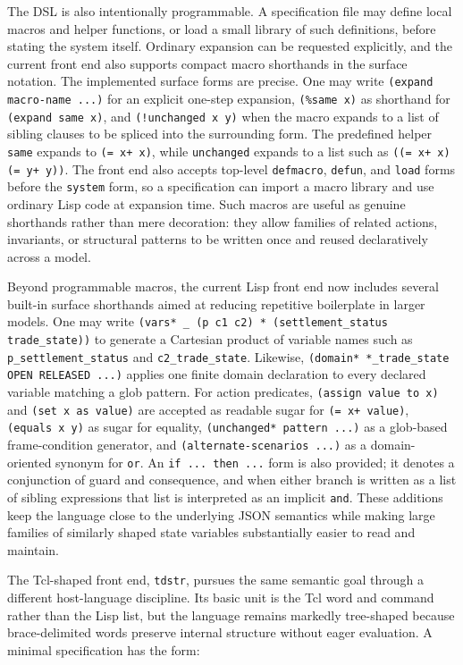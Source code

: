\documentclass[11pt]{article}
\begin{document}
The DSL is also intentionally programmable. A specification file may define
local macros and helper functions, or load a small library of such definitions,
before stating the system itself. Ordinary expansion can be requested
explicitly, and the current front end also supports compact macro shorthands in
the surface notation. The implemented surface forms are precise. One may write
\texttt{(expand macro-name ...)} for an explicit one-step expansion,
\texttt{(\%same x)} as shorthand for \texttt{(expand same x)}, and
\texttt{(!unchanged x y)} when the macro expands to a list of sibling clauses
to be spliced into the surrounding form. The predefined helper
\texttt{same} expands to \texttt{(= x+ x)}, while \texttt{unchanged} expands to
a list such as \texttt{((= x+ x) (= y+ y))}. The front end also accepts
top-level \texttt{defmacro}, \texttt{defun}, and \texttt{load} forms before the
\texttt{system} form, so a specification can import a macro library and use
ordinary Lisp code at expansion time. Such macros are useful as genuine
shorthands rather than mere decoration: they allow families of related actions,
invariants, or structural patterns to be written once and reused declaratively
across a model.

Beyond programmable macros, the current Lisp front end now includes several built-in
surface shorthands aimed at reducing repetitive boilerplate in larger models.
One may write \texttt{(vars* \_ (p c1 c2) * (settlement\_status trade\_state))}
to generate a Cartesian product of variable names such as
\texttt{p\_settlement\_status} and \texttt{c2\_trade\_state}. Likewise,
\texttt{(domain* *\_trade\_state OPEN RELEASED ...)} applies one finite
domain declaration to every declared variable matching a glob pattern. For
action predicates, \texttt{(assign value to x)} and
\texttt{(set x as value)} are accepted as readable sugar for
\texttt{(= x+ value)}, \texttt{(equals x y)} as sugar for equality,
\texttt{(unchanged* pattern ...)} as a glob-based frame-condition generator,
and \texttt{(alternate-scenarios ...)} as a domain-oriented synonym for
\texttt{or}. An \texttt{if ... then ...} form is also provided; it denotes a
conjunction of guard and consequence, and when either branch is written as a
list of sibling expressions that list is interpreted as an implicit
\texttt{and}. These additions keep the language close to the underlying JSON
semantics while making large families of similarly shaped state variables
substantially easier to read and maintain.

The Tcl-shaped front end, \texttt{tdstr}, pursues the same semantic goal
through a different host-language discipline. Its basic unit is the Tcl word
and command rather than the Lisp list, but the language remains markedly
tree-shaped because brace-delimited words preserve internal structure without
eager evaluation. A minimal specification has the form:
\end{document}
